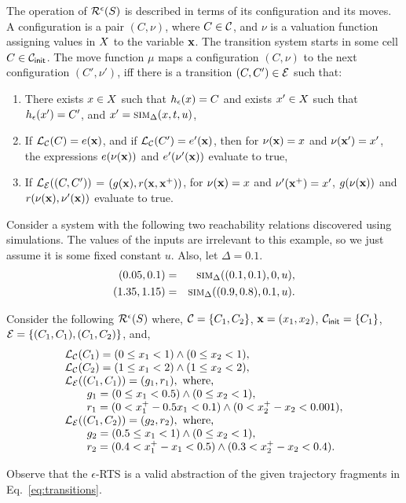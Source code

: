 The operation of $\mathcal{R}^{\epsilon}(S)$ is described in
terms of its configuration and its moves. A configuration is a pair
$(C, \nu)$, where $C \in \mathcal{C}$, and $\nu$ is a valuation function
assigning values in $X$ to the variable $\mathbf{x}$.  The
transition system starts in some cell $C \in \mathcal{C}_{\mathsf{init}}$.  The move
function $\mu$ maps a configuration $(C,\nu)$ to the next
configuration $(C',\nu')$, iff there is a transition $(C,C') \in
\mathcal{E}$ such that:
\begin{enumerate}
\item
There exists $x \in X$ such that
$h_\epsilon(x) = C$ and exists $x' \in
X$ such that $h_\epsilon(x') = C'$,
and $x' = \mbox{\sc sim}_\Delta(x, t, u)$,
\item
If $\mathcal{L}_\mathcal{C}(C) =  e(\mathbf{x})$, and if
$\mathcal{L}_\mathcal{C}(C') = e'(\mathbf{x})$, then for $\nu(\mathbf{x}) =
x$ and $\nu(\mathbf{x}') = x'$, the expressions
$e(\nu(\mathbf{x}))$ and $e'(\nu'(\mathbf{x}))$ evaluate to true, 
\item
If $\mathcal{L}_\mathcal{E}((C,C'))$ = $(g(\mathbf{x}), r(\mathbf{x},\mathbf{x}^{+}))$, 
for $\nu(\mathbf{x}) = x$ and $\nu'(\mathbf{x}^{+}) = x'$, 
$g(\nu(\mathbf{x}))$ and $r(\nu(\mathbf{x}), \nu'(\mathbf{x}))$ evaluate to true.
\end{enumerate}

\begin{example}
Consider a system with the following two reachability relations
discovered using simulations. The values of the inputs are irrelevant
to this example, so we just assume it is some fixed constant $u$.
Also, let $\Delta = 0.1$.
\begin{eqnarray}
\label{eq:transitions}
(0.05, 0.1) & = & \mbox{\sc sim}_\Delta((0.1, 0.1), 0, u), \\
(1.35,1.15) & = & \mbox{\sc sim}_\Delta((0.9, 0.8), 0.1, u).
\end{eqnarray}

Consider the following $\mathcal{R}^{\epsilon}(S)$ where,
$\mathcal{C} = \{C_1,C_2\}$, $\mathbf{x} = (x_1,x_2)$, $\mathcal{C}_{\mathsf{init}} = \{C_1\}$,
$\mathcal{E} = \{(C_1,C_1), (C_1, C_2)\}$, and,
\[ 
\begin{array}{l}
\mathcal{L}_\mathcal{C}(C_1) = (0 \le x_1 < 1) \wedge (0 \le x_2 < 1), \\
\mathcal{L}_\mathcal{C}(C_2) = (1 \le x_1 < 2) \wedge (1 \le x_2 < 2), \\
\mathcal{L}_\mathcal{E}((C_1,C_1)) = (g_1,r_1), \text{ where, } \\
\qquad g_1 = (0 \le x_1 < 0.5) \wedge (0 \le x_2 < 1), \\
\qquad r_1 = (0 < x^+_1 - 0.5x_1 < 0.1) \wedge (0 < x^+_2 - x_2 < 0.001), \\
\mathcal{L}_\mathcal{E}((C_1,C_2)) = (g_2,r_2), \text{ where, } \\
\qquad g_2 = (0.5 \le x_1 < 1) \wedge (0 \le x_2 < 1), \\
\qquad r_2 = (0.4 < x^+_1 - x_1 < 0.5) \wedge (0.3 < x^+_2 - x_2 < 0.4). \\
\end{array}
\]

Observe that the $\epsilon$-RTS is a valid abstraction of the given
trajectory fragments in Eq.~\ref{eq:transitions}.
\end{example}
